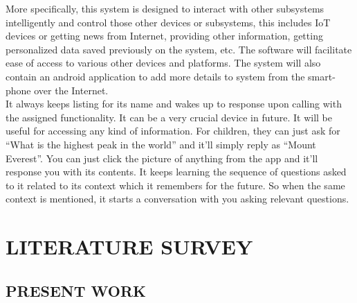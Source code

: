 \documentclass[12pt]{extreport}
\begin{document}
\noindent
More specifically, this system is designed to interact with other subsystems intelligently and control those other devices or subsystems, this includes IoT devices or getting news from Internet, providing other information, getting personalized data saved previously on the system, etc. The software will facilitate ease of access to various other devices and platforms. The system will also contain an android application to add more details to system from the smart-phone over the Internet.\\

\noindent
It always keeps listing for its name and wakes up to response upon calling with the assigned functionality. It can be a very crucial device in future. It will be useful for accessing any kind of information. For children, they can just ask for “What is the highest peak in the world” and it’ll simply reply as “Mount Everest”. You can just click the picture of anything from the app and it’ll response you with its contents. It keeps learning the sequence of questions asked to it related to its context which it remembers for the future. So when the same context is mentioned, it starts a conversation with you asking relevant questions.\\






\chapter{LITERATURE SURVEY}

\section{PRESENT WORK} 
\end{document}
